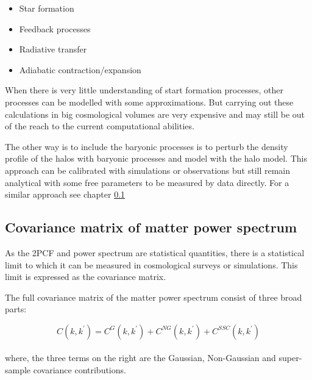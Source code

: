 \begin{itemize}
	\item Star formation
	\item Feedback processes
	\item Radiative transfer
	\item Adiabatic contraction/expansion
\end{itemize}

When there is very little understanding of start formation processes, other processes can be 
modelled with some approximations. But carrying out these calculations in big cosmological 
volumes are very expensive and may still be out of the reach to the current computational 
abilities. 

The other way is to include the baryonic processes is to perturb the density profile 
of the halos with baryonic processes and model with the halo model. This approach can 
be calibrated with simulations or observations but still remain analytical with some 
free parameters to be measured by data directly. For a similar approach see chapter \ref{}



\subsection{Covariance matrix of matter power spectrum}
As the 2PCF and power spectrum are statistical quantities, there is a statistical limit
to which it can be measured in cosmological surveys or simulations. This limit is expressed
as the covariance matrix. 

The full covariance matrix of the matter power spectrum consist of three broad parts:

\begin{equation}
	C(k,k^{\prime}) = C^{G}(k,k^{\prime}) + C^{NG}(k,k^{\prime}) + C^{SSC}(k,k^{\prime})
\end{equation}
\\
where, the three terms on the right are the Gaussian, Non-Gaussian and super-sample covariance contributions. 

